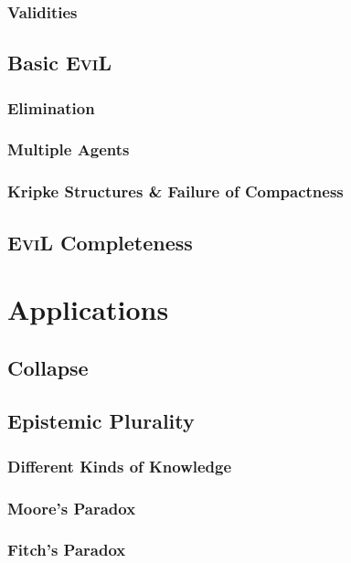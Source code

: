 \documentclass[11pt]{article}
\numberwithin{equation}{subsection}
\begin{document}
\subsubsection{Validities}
\label{validities}

\subsection{Basic \textsc{EviL}}
\label{dead-by-dawn}
\subsubsection{Elimination}
\label{elimination}

\subsubsection{Multiple Agents}\label{multi-agent}

\subsubsection{Kripke Structures \& Failure of Compactness}
\label{kripke} 
\label{non-compactness}

\subsection{\textsc{EviL} Completeness}\label{army-of-darkness}


\section{Applications}\label{applications}
\subsection{Collapse}
\subsection{Epistemic Plurality}
\subsubsection{Different Kinds of Knowledge}
\subsubsection{Moore's Paradox}
\subsubsection{Fitch's Paradox}
\end{document}
